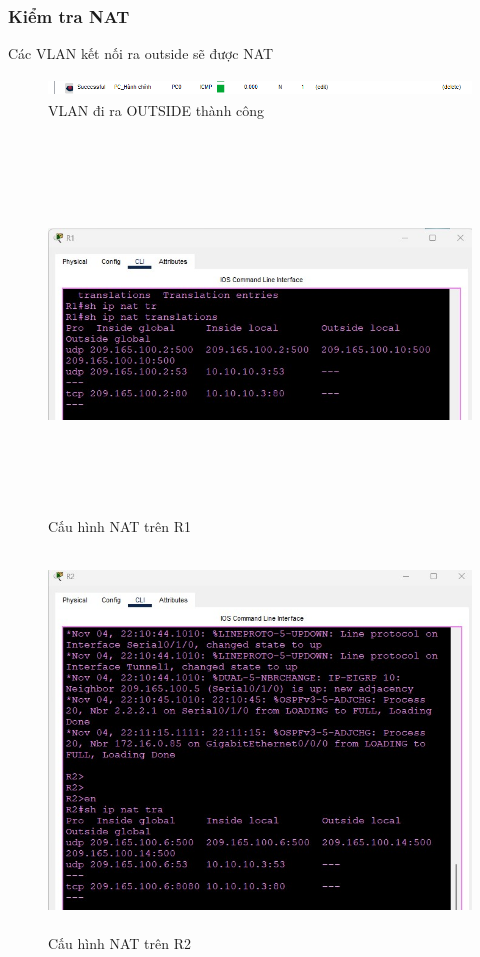 \documentclass[a4paper, 12pt]{article}
\begin{document}
\subsubsection{Kiểm tra NAT}
\hspace*{0.25cm}Các VLAN kết nối ra outside sẽ được NAT\\
\begin{figure}[H]
    \centering
    \includegraphics[width=16cm, height=0.5cm]{img/natout.png}
    \caption{VLAN đi ra OUTSIDE thành công}
    \label{nat1}
\end{figure}
\begin{figure}[H]
    \centering
    \includegraphics[width=16cm, height=10cm]{img/nat1.png}
    \caption{Cấu hình NAT trên R1}
    \label{nat1}
\end{figure}
\begin{figure}[H]
    \centering
    \includegraphics[width=16cm, height=10cm]{img/nat2.jpg}
    \caption{Cấu hình NAT trên R2}
    \label{nat2}
\end{figure}
\end{document}
